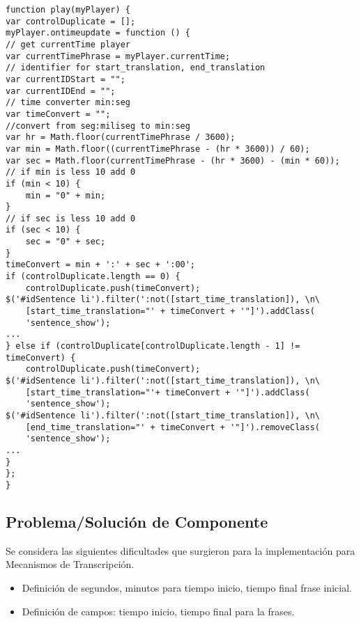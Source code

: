 \begin{itemize}
\begin{lstlisting}[]
function play(myPlayer) {
var controlDuplicate = [];
myPlayer.ontimeupdate = function () {
// get currentTime player
var currentTimePhrase = myPlayer.currentTime;
// identifier for start_translation, end_translation
var currentIDStart = "";
var currentIDEnd = "";
// time converter min:seg
var timeConvert = "";
//convert from seg:miliseg to min:seg
var hr = Math.floor(currentTimePhrase / 3600);
var min = Math.floor((currentTimePhrase - (hr * 3600)) / 60);
var sec = Math.floor(currentTimePhrase - (hr * 3600) - (min * 60));
// if min is less 10 add 0
if (min < 10) {
    min = "0" + min;
}
// if sec is less 10 add 0
if (sec < 10) {
    sec = "0" + sec;
}
timeConvert = min + ':' + sec + ':00';
if (controlDuplicate.length == 0) {
    controlDuplicate.push(timeConvert);
$('#idSentence li').filter(':not([start_time_translation]), \n\
    [start_time_translation="' + timeConvert + '"]').addClass(
    'sentence_show');
...
} else if (controlDuplicate[controlDuplicate.length - 1] != timeConvert) {
    controlDuplicate.push(timeConvert);
$('#idSentence li').filter(':not([start_time_translation]), \n\
    [start_time_translation="'+ timeConvert + '"]').addClass(
    'sentence_show');
$('#idSentence li').filter(':not([start_time_translation]), \n\
    [end_time_translation="' + timeConvert + '"]').removeClass(
    'sentence_show');
...
}
};
}     
\end{lstlisting}

\end{itemize}

\subsection{Problema/Soluci\'{o}n de Componente}

Se considera las siguientes dificultades que surgieron para la implementaci\'{o}n
para Mecanismos de Transcripci\'{o}n.

\begin{itemize}

\item Definici\'{o}n de segundos, minutos para tiempo inicio, tiempo final frase inicial.
\item Definici\'{o}n de campos: tiempo inicio, tiempo final para la frases.

\end{itemize}

